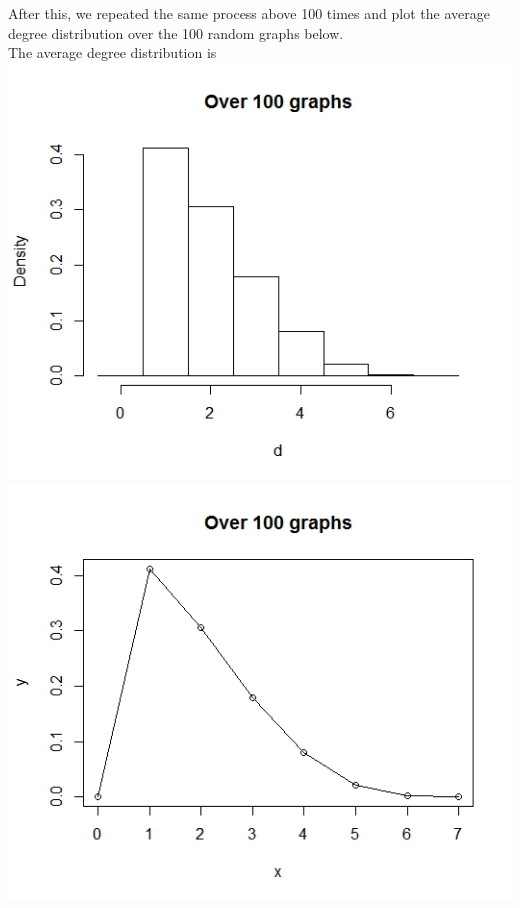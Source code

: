 \documentclass{article}
\begin{document}
After this, we repeated the same process above 100 times and plot the average degree distribution over the 100 random 
graphs below.\\

The average degree distribution is \\
\includegraphics[scale=0.4]{pc3} \\
\includegraphics[scale=0.4]{pc4} \\
\end{document}
